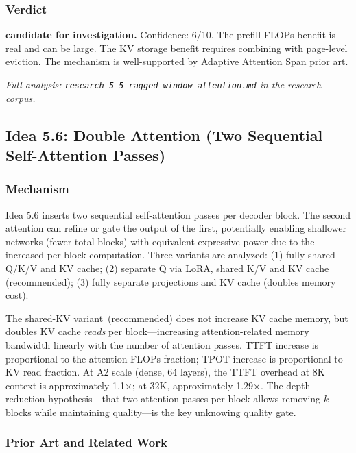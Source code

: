 \documentclass[11pt]{article}
\begin{document}
\subsubsection*{Verdict}

\noindent\textbf{candidate for investigation.} Confidence: 6/10. The prefill FLOPs benefit is real and can be large. The KV storage benefit requires combining with page-level eviction. The mechanism is well-supported by Adaptive Attention Span prior art.

\par\noindent\textit{Full analysis: \texttt{research\_5\_5\_ragged\_window\_attention.md} in the research corpus.}


\subsection{Idea 5.6: Double Attention (Two Sequential Self-Attention Passes)}
\label{subsec:idea56}

\subsubsection*{Mechanism}

Idea 5.6 inserts two sequential self-attention passes per decoder block. The second attention can refine or gate the output of the first, potentially enabling shallower networks (fewer total blocks) with equivalent expressive power due to the increased per-block computation. Three variants are analyzed: (1) fully shared Q/K/V and KV cache; (2) separate Q via LoRA, shared K/V and KV cache (recommended); (3) fully separate projections and KV cache (doubles memory cost).

The shared-KV variant~(recommended) does not increase KV cache memory, but doubles KV cache \emph{reads} per block---increasing attention-related memory bandwidth linearly with the number of attention passes. TTFT increase is proportional to the attention FLOPs fraction; TPOT increase is proportional to KV read fraction. At A2 scale (dense, 64 layers), the TTFT overhead at 8K context is approximately 1.1$\times$; at 32K, approximately 1.29$\times$. The depth-reduction hypothesis---that two attention passes per block allows removing $k$ blocks while maintaining quality---is the key unknowing quality gate.

\subsubsection*{Prior Art and Related Work}
\end{document}
